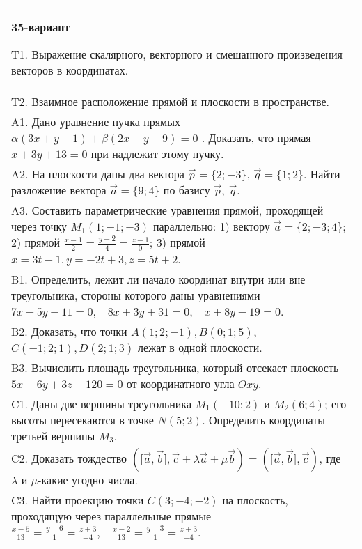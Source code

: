 \documentclass{article}
\begin{document}
\begin{tabular}{m{17cm}}
\textbf{35-вариант}
\newline

T1. 
Выражение скалярного, векторного и смешанного произведения векторов в координатах.
 \\
T2. 
Взаимное расположение прямой и плоскости в пространстве.
 \\
A1. 
Дано уравнение пучка прямых \(\alpha(3x + y - 1) + \beta(2x - y - 9) = 0\) . Доказать, что прямая \(x + 3y + 13 = 0\) при надлежит этому пучку.
 \\
A2. 
На плоскости даны два вектора \(\overrightarrow{p} = \{ 2; - 3\}\), \(\overrightarrow{q} = \{ 1;2\}\). Найти разложение вектора \(\overrightarrow{a} = \{ 9;4\}\) по базису \(\overrightarrow{p},\ \overrightarrow{q}\).
 \\
A3. 
Составить параметрические уравнения прямой, проходящей через точку \(M_{1}(1; - 1; - 3)\) параллельно: 1) вектору \(\overrightarrow{a} = \{ 2; - 3;4\}\); 2) прямой \(\frac{x - 1}{2} = \frac{y + 2}{4} = \frac{z - 1}{0}\); 3) прямой \(x = 3t - 1,y = - 2t + 3,z = 5t + 2\).
 \\
B1. 
Определить, лежит ли начало координат внутри или вне треугольника, стороны которого даны уравнениями \(7x - 5y - 11 = 0,\ \ \ \ 8x + 3y + 31 = 0,\ \ \ \ x + 8y - 19 = 0\).
 \\
B2. 
Доказать, что точки \(A(1;2; - 1),B(0;1;5)\), \(C( - 1;2;1),D(2;1;3)\) лежат в одной плоскости.
 \\
B3. 
Вычислить площадь треугольника, который отсекает плоскость \(5x - 6y + 3z + 120 = 0\) от координатного угла \(Oxy\).
 \\
C1. 
Даны две вершины треугольника \(M_{1}( - 10;2)\) и \(M_{2}(6;4)\); его высоты пересекаются в точке \(N(5;2)\). Определить координаты третьей вершины \(M_{3}\).
 \\
C2. 
Доказать тождество \((\lbrack\overrightarrow{a},\overrightarrow{b}\rbrack,\overrightarrow{c} + \lambda\overrightarrow{a} + \mu\overrightarrow{b}) = (\lbrack\overrightarrow{a},\overrightarrow{b}\rbrack,\overrightarrow{c})\), где \(\lambda\) и \(\mu\)-какие угодно числа.
 \\
C3. 
Найти проекцию точки \(C(3; - 4; - 2)\) на плоскость, проходящую через параллельные прямые \(\frac{x - 5}{13} = \frac{y - 6}{1} = \frac{z + 3}{- 4},\ \ \ \ \frac{x - 2}{13} = \frac{y - 3}{1} = \frac{z + 3}{- 4}\).
 \\

\end{tabular}
\vspace{1cm}
\end{document}
